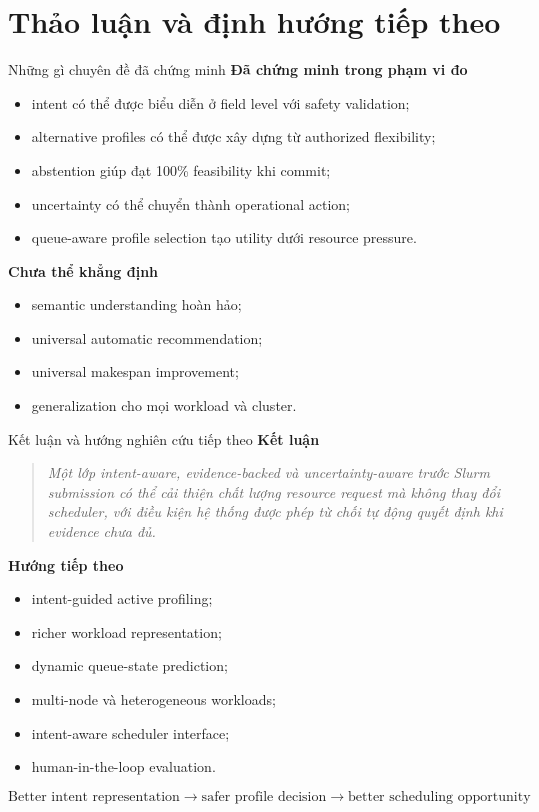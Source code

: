 \section{Thảo luận và định hướng tiếp theo}

\begin{frame}[t,shrink=20]{Những gì chuyên đề đã chứng minh}
\scriptsize
\vspace{0.15em}
\textbf{Đã chứng minh trong phạm vi đo}\par
\begin{itemize}
\item intent có thể được biểu diễn ở field level với safety validation;
\item alternative profiles có thể được xây dựng từ authorized flexibility;
\item abstention giúp đạt 100\% feasibility khi commit;
\item uncertainty có thể chuyển thành operational action;
\item queue-aware profile selection tạo utility dưới resource pressure.
\end{itemize}
\vspace{0.15em}
\textbf{Chưa thể khẳng định}\par
\begin{itemize}
\item semantic understanding hoàn hảo;
\item universal automatic recommendation;
\item universal makespan improvement;
\item generalization cho mọi workload và cluster.
\end{itemize}
\end{frame}

\begin{frame}[t,shrink=20]{Kết luận và hướng nghiên cứu tiếp theo}
\scriptsize
\vspace{0.15em}
\textbf{Kết luận}\par
\begin{quote}
\emph{Một lớp intent-aware, evidence-backed và uncertainty-aware trước Slurm submission có thể cải thiện chất lượng resource request mà không thay đổi scheduler, với điều kiện hệ thống được phép từ chối tự động quyết định khi evidence chưa đủ.}
\end{quote}
\vspace{0.15em}
\textbf{Hướng tiếp theo}\par
\begin{itemize}
\item intent-guided active profiling;
\item richer workload representation;
\item dynamic queue-state prediction;
\item multi-node và heterogeneous workloads;
\item intent-aware scheduler interface;
\item human-in-the-loop evaluation.
\end{itemize}
\[
\text{Better intent representation}
\rightarrow
\text{safer profile decision}
\rightarrow
\text{better scheduling opportunity}
\]
\end{frame}

